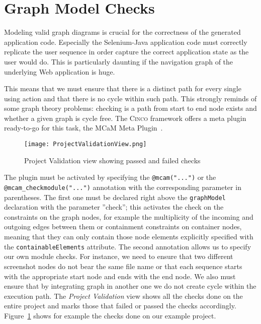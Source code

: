 \section{Graph Model Checks}\label{sec:modCheck}

Modeling valid graph diagrams is crucial for the correctness of the generated application code. Especially the Selenium-Java application code must correctly replicate the user sequence in order capture the correct application state as the user would do. This is particularly daunting if the navigation graph of the underlying Web application is huge.

This means that we must ensure that there is a distinct path for every single using action and that there is no cycle within such path. This strongly reminds of some graph theory problems: checking is a path from start to end node exists and whether a given graph is cycle free. The \textsc{Cinco} framework offers a meta plugin ready-to-go for this task, the MCaM Meta Plugin~\cite{gitlabcinco}.

\begin{figure}[h]
    \centering
    \texttt{[image: ProjectValidationView.png]}
    \caption{Project Validation view showing passed and failed checks}
    \label{fig:modelChecks}
\end{figure}

The plugin must be activated by specifying the \lstinline{@mcam("...")} or the \lstinline{@mcam_checkmodule("...")} annotation with the corresponding parameter in parentheses. The first one must be declared right above the \lstinline[language=MGL]{graphModel} declaration with the parameter ''check''; this activates the check on the constraints on the graph nodes, for example the multiplicity of the incoming and outgoing edges between them or containment constraints on container nodes, meaning that they can only contain those node elements explicitly specified with the \lstinline[language=MGL]{containableElements} attribute. The second annotation allows us to specify our own module checks. For instance, we need to ensure that two different screenshot nodes do not bear the same file name or that each sequence starts with the appropriate start node and ends with the end node. We also must ensure that by integrating graph in another one we do not create cycle within the execution path. The \textit{Project Validation} view shows all the checks done on the entire project and marks those that failed or passed the checks accordingly. Figure~\ref{fig:modelChecks} shows for example the checks done on our example project.

